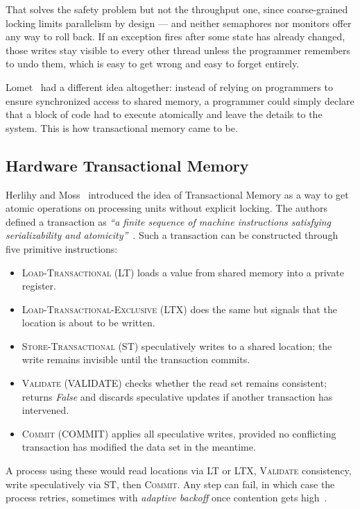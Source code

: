 That solves the safety problem but not the throughput one, since coarse-grained locking
limits parallelism by design — and neither semaphores
nor monitors offer any way to roll back. If an exception fires
after some state has already changed, those writes stay visible to every
other thread unless the programmer remembers to undo them, which is
easy to get wrong and easy to forget entirely.

Lomet~\cite{lomet1977} had a different idea altogether: instead of
relying on programmers to ensure synchronized access to shared memory,
a programmer could simply declare that a block of code had to execute
atomically and leave the details to the system.
This is how transactional memory came to be.

\subsection{Hardware Transactional Memory}

Herlihy and Moss~\cite{herlihy1993} introduced the idea of Transactional
Memory as a way to get atomic operations on processing units without
explicit locking. The authors defined a transaction as
\textit{``a finite sequence of machine instructions satisfying
  serializability and atomicity''}~\cite{herlihy1993}. Such a transaction
can be constructed through five primitive instructions:

\begin{itemize}
  \item \textsc{Load-Transactional} (LT) loads a value from shared memory into
        a private register.
  \item \textsc{Load-Transactional-Exclusive} (LTX) does the same but signals
        that the location is about to be written.
  \item \textsc{Store-Transactional} (ST) speculatively writes to a shared
        location; the write remains invisible until the transaction commits.
  \item \textsc{Validate} (VALIDATE) checks whether the read set remains
        consistent; returns \textit{False} and discards speculative updates if another
        transaction has intervened.
  \item \textsc{Commit} (COMMIT) applies all speculative writes, provided
        no conflicting transaction has modified the data set in the meantime.
\end{itemize}

A process using these would read locations via LT or LTX, \textsc{Validate}
consistency, write speculatively via ST, then \textsc{Commit}. Any step can
fail, in which case the process retries, sometimes with \emph{adaptive
  backoff} once contention gets high~\cite{herlihy1993}.

